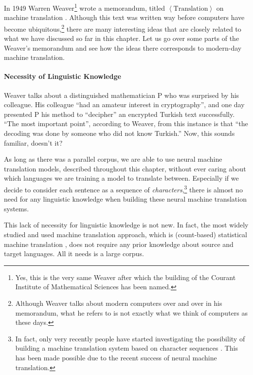 \documentclass{report}
\begin{document}
In 1949 Warren Weaver\footnote{
    Yes, this is the very same Weaver after which the building of the Courant
    Institute of Mathematical Sciences has been named.
} wrote a memorandum, titled $\left<\text{Translation}\right>$ on machine
translation \cite{weaver1955translation}. Although this text was written way
before computers have become ubiquitous,\footnote{
    Although Weaver talks about modern computers over and over in his
    memorandum, what he refers to is not exactly what we think of computers as
    these days.
} there are many interesting ideas that are closely related to what we have
discussed so far in this chapter. Let us go over some parts of the Weaver's
memorandum and see how the ideas there corresponds to modern-day machine
translation.

\paragraph{Necessity of Linguistic Knowledge}

Weaver talks about a distinguished mathematician P who was surprised by his
colleague. His colleague ``had an amateur interest in cryptography'', and one
day presented P his method to ``decipher'' an encrypted Turkish text
successfully. ``The most important point'', according to Weaver, from this
instance is that ``the decoding was done by someone who did not know Turkish.''
Now, this sounds familiar, doesn't it? 

As long as there was a parallel corpus, we are able to use neural machine
translation models, described throughout this chapter, without ever caring about
which languages we are training a model to translate between.  Especially if we
decide to consider each sentence as a sequence of {\em characters},\footnote{
    In fact, only very recently people have started investigating the
    possibility of building a machine translation system based on character
    sequences \cite{ling2015character}. This has been made possible due to the
    recent success of neural machine translation.
}
there is almost no need for any linguistic knowledge when building these neural
machine translation systems. 

This lack of necessity for linguistic knowledge is not new. In fact, the most
widely studied and used machine translation approach, which is (count-based)
statistical machine translation
\cite{brown1990statistical,koehn2003statistical}, does not require any prior
knowledge about source and target languages. All it needs is a large corpus.
\end{document}

